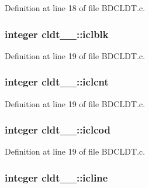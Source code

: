 Definition at line 18 of file B\+D\+C\+L\+D\+T.\+c.

\subsubsection[{\texorpdfstring{iclblk}{iclblk}}]{\setlength{\rightskip}{0pt plus 5cm}integer cldt\+\_\+\_\+\+::iclblk}\hypertarget{structcldt__1___ac770c553974e437c422c04f5eb9a551b}{}\label{structcldt__1___ac770c553974e437c422c04f5eb9a551b}


Definition at line 19 of file B\+D\+C\+L\+D\+T.\+c.

\subsubsection[{\texorpdfstring{iclcnt}{iclcnt}}]{\setlength{\rightskip}{0pt plus 5cm}integer cldt\+\_\+\_\+\+::iclcnt}\hypertarget{structcldt__1___af51524b57aae104a023621870795580d}{}\label{structcldt__1___af51524b57aae104a023621870795580d}


Definition at line 19 of file B\+D\+C\+L\+D\+T.\+c.

\subsubsection[{\texorpdfstring{iclcod}{iclcod}}]{\setlength{\rightskip}{0pt plus 5cm}integer cldt\+\_\+\_\+\+::iclcod}\hypertarget{structcldt__1___a83e91f0eb72a8f7f252200e579e8ff91}{}\label{structcldt__1___a83e91f0eb72a8f7f252200e579e8ff91}


Definition at line 19 of file B\+D\+C\+L\+D\+T.\+c.

\subsubsection[{\texorpdfstring{icline}{icline}}]{\setlength{\rightskip}{0pt plus 5cm}integer cldt\+\_\+\_\+\+::icline}\hypertarget{structcldt__1___aa24a2d5c5059dbe5454464958a4679e6}{}\label{structcldt__1___aa24a2d5c5059dbe5454464958a4679e6}


